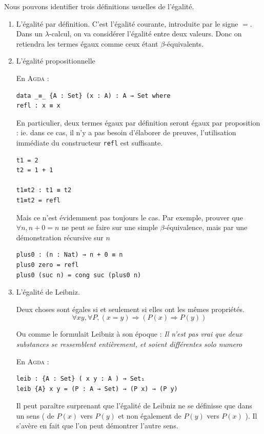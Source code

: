 Nous pouvons identifier trois définitions usuelles de l'égalité.
\begin{enumerate}

	\item L'égalité par définition.
	C'est l'égalité courante, introduite par le signe $=$. Dans un $\lambda$-calcul, on va considérer l'égalité entre deux
	valeurs. Donc on retiendra les termes égaux comme ceux étant $\beta$-équivalents.

	\item L'égalité propositionnelle

En \textsc{Agda} :

\begin{verbatim}
data _≡_ {A : Set} (x : A) : A → Set where
refl : x ≡ x	
\end{verbatim}
En particulier, deux termes égaux par définition seront égaux par proposition : ie. dans ce cas, il 
n'y a pas besoin d'élaborer de preuves, l'utilisation immédiate du constructeur \verb+refl+ est suffisante.
\begin{verbatim}
t1 = 2
t2 = 1 + 1

t1≡t2 : t1 ≡ t2
t1≡t2 = refl
\end{verbatim}
Mais ce n'est évidemment pas toujours le cas. Par exemple, prouver que $\forall n, n + 0 = n$ ne peut se faire
sur une simple $\beta$-équivalence, mais par une démonstration récursive sur $n$
\begin{verbatim}
plus0 : (n : Nat) → n + 0 ≡ n
plus0 zero = refl
plus0 (suc n) = cong suc (plus0 n)  
\end{verbatim}
	\item L'égalité de Leibniz.

Deux choses sont égales si et seulement si elles ont les mêmes propriétés.
$$ \forall x y, \forall P, (x=y) \Rightarrow (P(x) \Rightarrow P(y)) $$

Ou comme le formulait Leibniz à son époque :
 \textit{Il n'est pas vrai que deux substances se ressemblent entièrement, et soient différentes solo numero}

En \textsc{Agda} :
\begin{verbatim}
leib : {A : Set} ( x y : A ) → Set₁
leib {A} x y = (P : A → Set) → (P x) → (P y)
\end{verbatim}

Il peut paraître surprenant que l'égalité de Leibniz ne se définisse que dans un sens ( de $P(x)$ vers $P(y)$ et non également de
$P(y)$ vers $P(x)$ ). Il s'avère en fait que l'on peut démontrer l'autre sens.


\end{enumerate}
